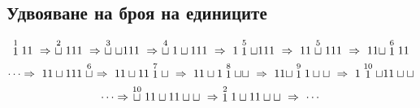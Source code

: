 \subsection*{Удвояване на броя на единиците}

\[\stackrel{1}{1}11\ \Rightarrow\ \stackrel{2}{\blank} 111\ \Rightarrow\ \stackrel{3}{\blank}\blank 111\ \Rightarrow\ \stackrel{4}{\blank}1\blank 111\ \Rightarrow\ 1\stackrel{5}{1}\blank 111\ \Rightarrow\  11\stackrel{5}{\blank}111\ \Rightarrow\  11 \blank \stackrel{6}{1}11\]
\[\dots \Rightarrow\ 11\blank 111\stackrel{6}{\blank}\ \Rightarrow\ 11\blank 11\stackrel{7}{1}\blank\ \Rightarrow\ 11\blank 1\stackrel{8}{1}\blank\blank\ \Rightarrow\ 11\blank \stackrel{9}{1}1\blank\blank\ \Rightarrow\  1\stackrel{10}{1}\blank 11\blank\blank\]
\[\dots \Rightarrow\ \stackrel{10}{\blank}11\blank 11\blank\blank\ \Rightarrow\ \stackrel{2}{1}1\blank 11\blank\blank\ \Rightarrow\ \cdots\]

